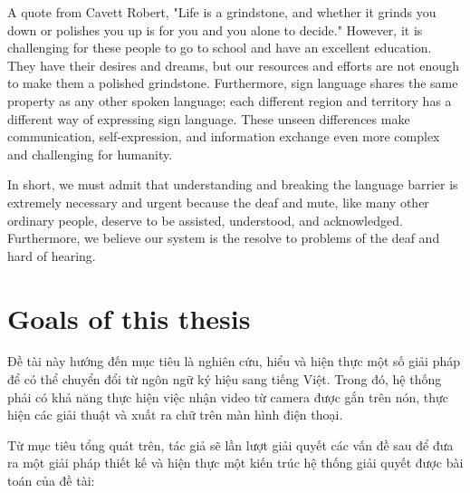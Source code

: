 A quote from Cavett Robert, "Life is a grindstone, and whether it grinds you down or polishes you up is for you and you alone to decide." However, it is challenging for these people to go to school and have an excellent education. They have their desires and dreams, but our resources and efforts are not enough to make them a polished grindstone. Furthermore, sign language shares the same property as any other spoken language; each different region and territory has a different way of expressing sign language. These unseen differences make communication, self-expression, and information exchange even more complex and challenging for humanity.

In short, we must admit that understanding and breaking the language barrier is extremely necessary and urgent because the deaf and mute, like many other ordinary people, deserve to be assisted, understood, and acknowledged. Furthermore, we believe our system is the resolve to problems of the deaf and hard of hearing.

\section{Goals of this thesis}



  Đề tài này hướng đến mục tiêu là nghiên cứu, hiểu và hiện thực một số giải pháp để có thể chuyển đổi từ ngôn ngữ ký hiệu sang tiếng Việt. Trong đó, hệ thống phải có khả năng thực hiện việc nhận video từ camera được gắn trên nón, thực hiện các giải thuật và xuất ra chữ trên màn hình điện thoại.

  Từ mục tiêu tổng quát trên, tác giả sẽ lần lượt giải quyết các vấn đề sau để đưa ra một giải pháp thiết kế và hiện thực một kiến trúc hệ thống giải quyết được bài toán của đề tài:
  

